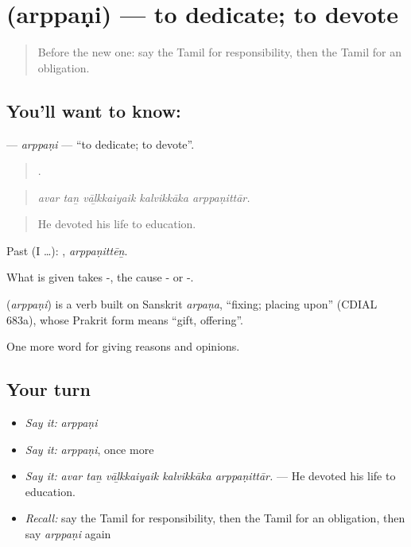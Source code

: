 \section[\texorpdfstring{\ta{அர்ப்பணி} (arppaṇi)}{அர்ப்பணி (arppaṇi)}]{ (arppaṇi) — to dedicate; to devote}

\label{lesson:TA-C380-arppani}



\begin{quote}
Before the new one: say the Tamil for responsibility, then the Tamil for an obligation.
\end{quote}

\subsection*{You'll want to know: }
\textbf{} — \emph{arppaṇi} — \textquotedblleft{}to dedicate; to devote\textquotedblright{}.

\begin{quote}
    .
\end{quote}

\begin{quote}
\emph{avar taṉ vāḻkkaiyaik kalvikkāka arppaṇittār.}
\end{quote}

\begin{quote}
He devoted his life to education.
\end{quote}

Past (I …): , \emph{arppaṇittēṉ}.

What is given takes -, the cause - or -.

\begin{cousinweb}
\textbf{} (\emph{arppaṇi}) is a verb built on Sanskrit \emph{arpaṇa}, \textquotedblleft{}fixing; placing upon\textquotedblright{} (CDIAL 683a), whose Prakrit form means \textquotedblleft{}gift, offering\textquotedblright{}.
\end{cousinweb}

\begin{grammarlens}[title={What you've built}]
One more word for giving reasons and opinions.
\end{grammarlens}

\subsection*{Your turn}
\begin{itemize}
\raggedright
  \item \emph{Say it:} \emph{arppaṇi}
  \item \emph{Say it:} \emph{arppaṇi}, once more
  \item \emph{Say it:} \emph{avar taṉ vāḻkkaiyaik kalvikkāka arppaṇittār.} — He devoted his life to education.
  \item \emph{Recall:} say the Tamil for responsibility, then the Tamil for an obligation, then say \emph{arppaṇi} again
\end{itemize}

